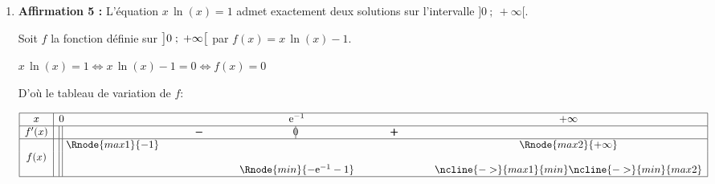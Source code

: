 \documentclass[10pt]{article}
\providecommand{\e}{{\mathrm{e}}}
\providecommand{\ds}{\displaystyle}
\begin{document}
\begin{enumerate}
\begin{enumerate}
Donc, pour tout $x$ de $] - \infty~;~2[$, on a $x\left (\e^{x}-1\right ) \geqslant 0$ donc $g(x) \leqslant x$.








 
  \hfill\textbf{Affirmation 4 vraie}
\end{enumerate}
	
\item \textbf{Affirmation 5 :} 
\og  L'équation $x\, \ln (x) = 1$ admet exactement deux solutions sur l'intervalle $]0~;~ +\infty[$. \fg{}

Soit $f$ la fonction définie sur $\left ]0\;;\;+\infty\strut\right [$ par $f(x)=x\,\ln(x)-1$.

$x\, \ln (x) = 1 \iff x\, \ln (x) - 1 = 0 \iff f(x)=0$


D'où le tableau de variation de $f$:

\begin{center}
{\renewcommand{\arraystretch}{1.1}
\def\esp{\hspace*{2cm}}
\def\hauteur{0pt}
$\begin{array}{|c| l  *4{c}|}
\hline
 x & 0 & \esp & \e^{-1} & \esp & +\infty \\
 \hline
f'(x) & \vline\;\vline &  \pmb{-} & \vline\hspace{-2.7pt}0 & \pmb{+} & \\  
\hline
  & \vline\;\vline~\Rnode{max1}{-1}  &  &  &  & \Rnode{max2}{+\infty} \\
f(x) &\vline\;\vline &  & & &  \rule{0pt}{\hauteur} \\
 & \vline\;\vline & &   \Rnode{min}{-\e^{-1}-1} & & \rule{0pt}{\hauteur}
\ncline{->}{max1}{min} \ncline{->}{min}{max2}\\
\hline
\end{array}$
}
\end{center}	


\end{enumerate}
\end{document}
